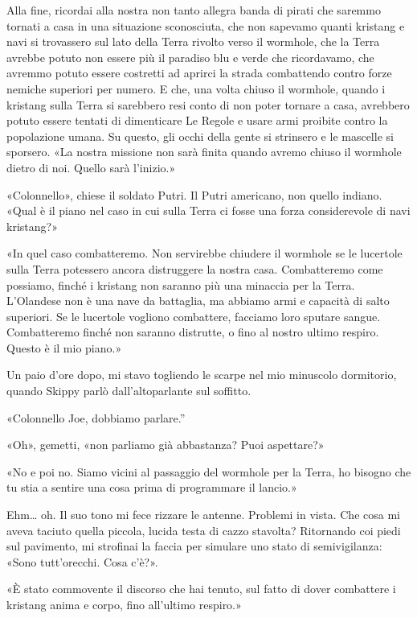 Alla fine, ricordai alla nostra non tanto allegra banda di pirati che
saremmo tornati a casa in una situazione sconosciuta, che non sapevamo
quanti kristang e navi si trovassero sul lato della Terra rivolto verso
il wormhole, che la Terra avrebbe potuto non essere più il paradiso blu
e verde che ricordavamo, che avremmo potuto essere costretti ad aprirci
la strada combattendo contro forze nemiche superiori per numero. E che,
una volta chiuso il wormhole, quando i kristang sulla Terra si sarebbero
resi conto di non poter tornare a casa, avrebbero potuto essere tentati
di dimenticare Le Regole e usare armi proibite contro la popolazione
umana. Su questo, gli occhi della gente si strinsero e le mascelle si
sporsero. «La nostra missione non sarà finita quando avremo chiuso il
wormhole dietro di noi. Quello sarà l'inizio.»

«Colonnello», chiese il soldato Putri. Il Putri americano, non quello
indiano. «Qual è il piano nel caso in cui sulla Terra ci fosse una forza
considerevole di navi kristang?»

«In quel caso combatteremo. Non servirebbe chiudere il wormhole se le
lucertole sulla Terra potessero ancora distruggere la nostra casa.
Combatteremo come possiamo, finché i kristang non saranno più una
minaccia per la Terra. L'Olandese non è una nave da battaglia, ma
abbiamo armi e capacità di salto superiori. Se le lucertole vogliono
combattere, facciamo loro sputare sangue. Combatteremo finché non
saranno distrutte, o fino al nostro ultimo respiro. Questo è il mio
piano.»

\hfill\break

Un paio d'ore dopo, mi stavo togliendo le scarpe nel mio minuscolo
dormitorio, quando Skippy parlò dall'altoparlante sul soffitto.

«Colonnello Joe, dobbiamo parlare.''

«Oh», gemetti, «non parliamo già abbastanza? Puoi aspettare?»

«No e poi no. Siamo vicini al passaggio del wormhole per la Terra, ho
bisogno che tu stia a sentire una cosa prima di programmare il lancio.»

Ehm\ldots{} oh. Il suo tono mi fece rizzare le antenne. Problemi in
vista. Che cosa mi aveva taciuto quella piccola, lucida testa di cazzo
stavolta? Ritornando coi piedi sul pavimento, mi strofinai la faccia per
simulare uno stato di semivigilanza: «Sono tutt'orecchi. Cosa c'è?».

«È stato commovente il discorso che hai tenuto, sul fatto di dover
combattere i kristang anima e corpo, fino all'ultimo respiro.»

